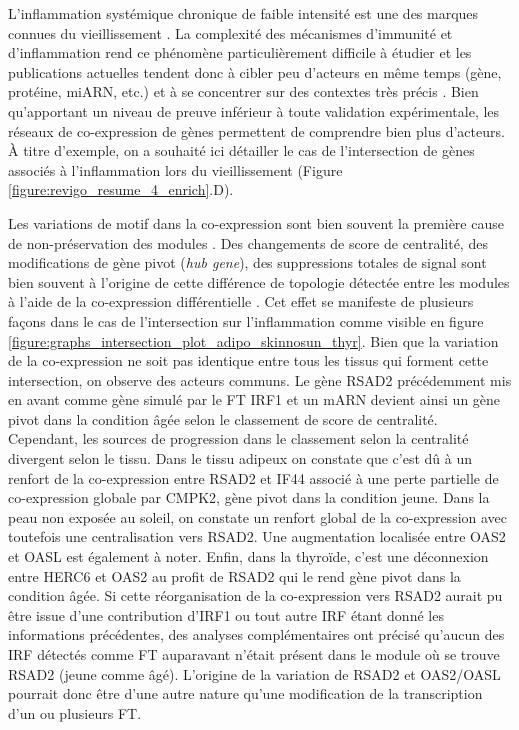 L'inflammation systémique chronique de faible intensité est une des marques connues du vieillissement . La complexité des mécanismes d'immunité et d'inflammation rend ce phénomène particulièrement difficile à étudier et les publications actuelles tendent donc à cibler peu d'acteurs en même temps (gène, protéine, miARN, etc.) et à se concentrer sur des contextes très précis . Bien qu'apportant un niveau de preuve inférieur à toute validation expérimentale, les réseaux de co-expression de gènes permettent de comprendre bien plus d'acteurs. À titre d'exemple, on a souhaité ici détailler le cas de l'intersection de gènes associés à l'inflammation lors du vieillissement (Figure \ref{figure:revigo_resume_4_enrich}.D).


Les variations de motif dans la co-expression sont bien souvent la première cause de non-préservation des modules . Des changements de score de centralité, des modifications de gène pivot (\textit{hub gene}), des suppressions totales de signal sont bien souvent à l'origine de cette différence de topologie détectée entre les modules à l'aide de la co-expression différentielle . Cet effet se manifeste de plusieurs façons dans le cas de l'intersection sur l'inflammation comme visible en figure \ref{figure:graphs_intersection_plot_adipo_skinnosun_thyr}. Bien que la variation de la co-expression ne soit pas identique entre tous les tissus qui forment cette intersection, on observe des acteurs communs. Le gène RSAD2 précédemment mis en avant comme gène simulé par le FT IRF1 et un mARN devient ainsi un gène pivot dans la condition âgée selon le classement de score de centralité. Cependant, les sources de progression dans le classement selon la centralité divergent selon le tissu. Dans le tissu adipeux on constate que c'est dû à un renfort de la co-expression entre RSAD2 et IF44 associé à une perte partielle de co-expression globale par CMPK2, gène pivot dans la condition jeune. Dans la peau non exposée au soleil, on constate un renfort global de la co-expression avec toutefois une centralisation vers RSAD2. Une augmentation localisée entre OAS2 et OASL est également à noter. Enfin, dans la thyroïde, c'est une déconnexion entre HERC6 et OAS2 au profit de RSAD2 qui le rend gène pivot dans la condition âgée. Si cette réorganisation de la co-expression vers RSAD2 aurait pu être issue d'une contribution d'IRF1 ou tout autre IRF étant donné les informations précédentes, des analyses complémentaires ont précisé qu'aucun des IRF détectés comme FT auparavant n'était présent dans le module où se trouve RSAD2 (jeune comme âgé). L'origine de la variation de RSAD2 et OAS2/OASL pourrait donc être d'une autre nature qu'une modification de la transcription d'un ou plusieurs FT.

